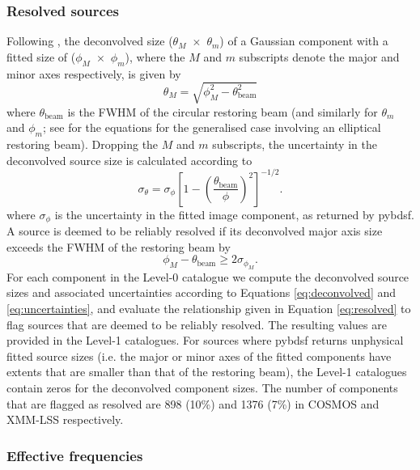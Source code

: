 \documentclass[usenatbib,usedcolumn]{mnras}
\begin{document}
\subsubsection{Resolved sources}
\label{sec:resolved}

Following \citet{murphy2017}, the deconvolved size ($\theta_{M}$~$\times$~$\theta_{m}$) of a Gaussian component with a fitted size of ($\phi_{M}$~$\times$~$\phi_{m}$), where the $M$ and $m$ subscripts denote the major and minor axes respectively, is given by\begin{equation}
\label{eq:deconvolved}
\theta_{M} = \sqrt{\phi_{M}^{2} - \theta_{\mathrm{beam}}^{2}}
\end{equation}
where $\theta_{\mathrm{beam}}$ is the FWHM of the circular restoring beam (and similarly for $\theta_{m}$ and $\phi_{m}$; see \citealt{wild1970} for the equations for the generalised case involving an elliptical restoring beam). Dropping the $M$ and $m$ subscripts, the uncertainty in the deconvolved source size is calculated according to
\begin{equation}
\label{eq:uncertainties}
\sigma_{\theta} = \sigma_{\phi} \left[ 1 - \left(\frac{\theta_{\mathrm{beam}}}{\phi}\right)^{2}\right]^{-1/2}.
\end{equation}
where $\sigma_{\phi}$ is the uncertainty in the fitted image component, as returned by {\sc pybdsf}. A source is deemed to be reliably resolved if its deconvolved major axis size exceeds the FWHM of the restoring beam by
\begin{equation}
\label{eq:resolved}
\phi_{M} - \theta_{\mathrm{beam}} \geq 2\sigma_{\phi_{M}}.
\end{equation}
For each component in the Level-0 catalogue we compute the deconvolved source sizes and associated uncertainties according to Equations \ref{eq:deconvolved} and \ref{eq:uncertainties}, and evaluate the relationship given in Equation \ref{eq:resolved} to flag sources that are deemed to be reliably resolved. The resulting values are provided in the Level-1 catalogues. For sources where {\sc pybdsf} returns unphysical fitted source sizes (i.e. the major or minor axes of the fitted components have extents that are smaller than that of the restoring beam), the Level-1 catalogues contain zeros for the deconvolved component sizes. The number of components that are flagged as resolved are 898 (10\%) and 1376 (7\%) in COSMOS and XMM-LSS respectively.

\subsubsection{Effective frequencies}
\label{sec:frequency_corrections}
\end{document}
